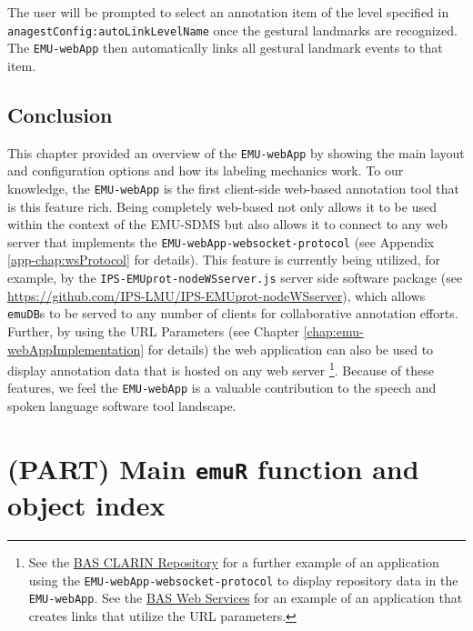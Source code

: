 \documentclass[]{book}
\let\rmarkdownfootnote\footnote%
\def\footnote{\protect\rmarkdownfootnote}
\begin{document}
The user will be prompted to select an annotation item of the level specified in \texttt{anagestConfig:autoLinkLevelName} once the gestural landmarks are recognized. The \texttt{EMU-webApp} then automatically links all gestural landmark events to that item.

\hypertarget{conclusion-5}{%
\section{Conclusion}\label{conclusion-5}}

This chapter provided an overview of the \texttt{EMU-webApp} by showing the main layout and configuration options and how its labeling mechanics work. To our knowledge, the \texttt{EMU-webApp} is the first client-side web-based annotation tool that is this feature rich. Being completely web-based not only allows it to be used within the context of the EMU-SDMS but also allows it to connect to any web server that implements the \texttt{EMU-webApp-websocket-protocol} (see Appendix \ref{app-chap:wsProtocol} for details). This feature is currently being utilized, for example, by the \texttt{IPS-EMUprot-nodeWSserver.js} server side software package (see \url{https://github.com/IPS-LMU/IPS-EMUprot-nodeWSserver}), which allows \texttt{emuDB}s to be served to any number of clients for collaborative annotation efforts. Further, by using the URL Parameters (see Chapter \ref{chap:emu-webAppImplementation} for details) the web application can also be used to display annotation data that is hosted on any web server \footnote{See the \href{http://hdl.handle.net/11858/00-1779-0000-0006-BF00-E}{BAS CLARIN Repository} for a further example of an application using the \texttt{EMU-webApp-websocket-protocol} to display repository data in the \texttt{EMU-webApp}. See the \href{http://hdl.handle.net/11858/00-1779-0000-0028-421B-4}{BAS Web Services} for an example of an application that creates links that utilize the URL parameters.}. Because of these features, we feel the \texttt{EMU-webApp} is a valuable contribution to the speech and spoken language software tool landscape.

\hypertarget{part-main-emur-function-and-object-index}{%
\chapter*{\texorpdfstring{(PART) Main \texttt{emuR} function and object index}{(PART) Main emuR function and object index}}\label{part-main-emur-function-and-object-index}}
\end{document}
